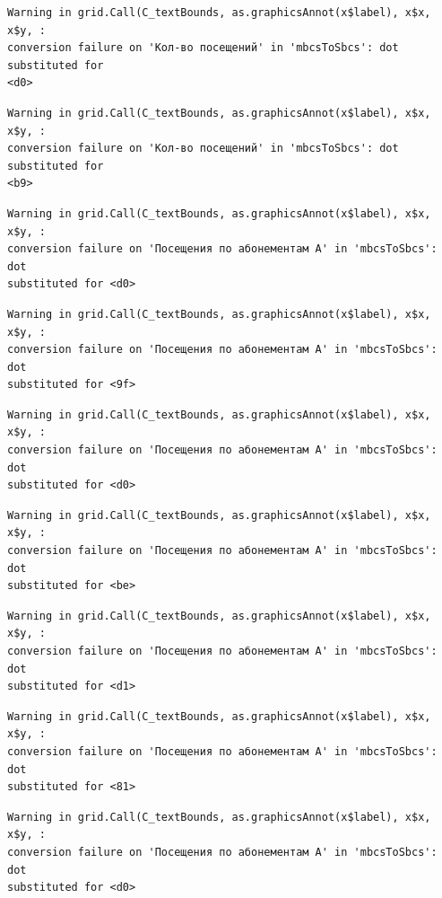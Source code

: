 \documentclass[
  letterpaper,
  DIV=11,
  numbers=noendperiod]{scrartcl}
\begin{document}
\begin{verbatim}
Warning in grid.Call(C_textBounds, as.graphicsAnnot(x$label), x$x, x$y, :
conversion failure on 'Кол-во посещений' in 'mbcsToSbcs': dot substituted for
<d0>
\end{verbatim}

\begin{verbatim}
Warning in grid.Call(C_textBounds, as.graphicsAnnot(x$label), x$x, x$y, :
conversion failure on 'Кол-во посещений' in 'mbcsToSbcs': dot substituted for
<b9>
\end{verbatim}

\begin{verbatim}
Warning in grid.Call(C_textBounds, as.graphicsAnnot(x$label), x$x, x$y, :
conversion failure on 'Посещения по абонементам А' in 'mbcsToSbcs': dot
substituted for <d0>
\end{verbatim}

\begin{verbatim}
Warning in grid.Call(C_textBounds, as.graphicsAnnot(x$label), x$x, x$y, :
conversion failure on 'Посещения по абонементам А' in 'mbcsToSbcs': dot
substituted for <9f>
\end{verbatim}

\begin{verbatim}
Warning in grid.Call(C_textBounds, as.graphicsAnnot(x$label), x$x, x$y, :
conversion failure on 'Посещения по абонементам А' in 'mbcsToSbcs': dot
substituted for <d0>
\end{verbatim}

\begin{verbatim}
Warning in grid.Call(C_textBounds, as.graphicsAnnot(x$label), x$x, x$y, :
conversion failure on 'Посещения по абонементам А' in 'mbcsToSbcs': dot
substituted for <be>
\end{verbatim}

\begin{verbatim}
Warning in grid.Call(C_textBounds, as.graphicsAnnot(x$label), x$x, x$y, :
conversion failure on 'Посещения по абонементам А' in 'mbcsToSbcs': dot
substituted for <d1>
\end{verbatim}

\begin{verbatim}
Warning in grid.Call(C_textBounds, as.graphicsAnnot(x$label), x$x, x$y, :
conversion failure on 'Посещения по абонементам А' in 'mbcsToSbcs': dot
substituted for <81>
\end{verbatim}

\begin{verbatim}
Warning in grid.Call(C_textBounds, as.graphicsAnnot(x$label), x$x, x$y, :
conversion failure on 'Посещения по абонементам А' in 'mbcsToSbcs': dot
substituted for <d0>
\end{verbatim}
\end{document}
